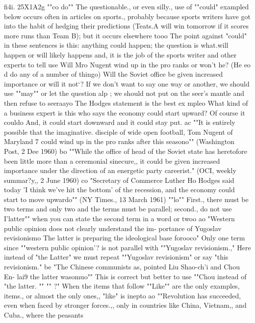 \documentclass[
    oneside,
    11pt,
    draft
]{memoir}
\begin{document}
fi4i. 25X1A2g ""co do"" The questionable., or even silly., use of ""could" exampled below occurs often in articles on sports., probably because sports writers have got into the habit of hedging their predictions (Teats.A will win tomorrow if it scores more runs than Team B); but it occurs elsewhere tooo The point against "could" in these sentences is this: anything could happen; the question is what.will happen or will likely happens and, it is the job of the sports writer and other experts to tell use Will Mro Nugent wind up in the pro ranks or won't he? (He eo d do any of a number of thingo) Will the Soviet office be given increased importance or will it not`? If we don't want to say one way or another, we should use ""may"" or let the question alp ; we should not put on the seer's mantle and then refuse to seeraayo The Hodges statement is the best ex mpleo What kind of a business expert is this who says the economy could start upward? Of course it couldo And, it could start downward and it could stay put. ac ""It is entirely possible that the imaginative. disciple of wide open football, Tom Nugent of Maryland 7 could wind up in the pro ranks after this seasono"" (Washington Post, 2 Dee 1960) bo ""While the office of head of the Soviet state has heretofore been little more than a ceremonial sinecure,, it could be given increased importance under the direction of an energetic party careerist." (OCI, weekly summar?y,, 2 June 1960) co "Secretary of Commerce Luther Ho Hodges said today 'I think we've hit the bottom' of the recession, and the economy could start to move upwardo"" (NY Times., 13 March 1961) ""lo"" First., there must be two terms and only two and the terms must be parallel; second., do not use I'latter"" when you can state the second term in a word or twoo ao "Western public opinion does not clearly understand the im- portance of Yugoslav revisionismo The latter is preparing the ideological base forooco" Only one term since ""western public opinion'? is not parallel with ""Yugoslav revisionism.," Here instead of "the Latter" we must repeat ""Yugoslav revisionism" or say "this revisionism." be "The Chinese communists as, pointed Liu Shao-ch'i and Chou En- lai9 the latter wasomuo"" This is correct but better to use ""Chou instead of "the latter. "" "" ?" When the items that follow ""Like"" are the only examples, items., or almost the only ones,, "like" is inepto ao ""Revolution has succeeded, even when faced by stronger forces.,, only in countries like China, Vietnam,, and Cuba., where the peasants
\end{document}

